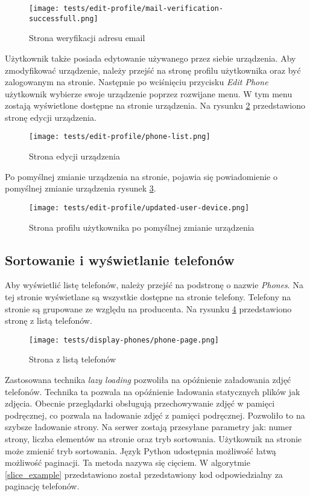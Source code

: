 \begin{figure}[H]
  \centering
  \texttt{[image: tests/edit-profile/mail-verification-successfull.png]}
  \caption{Strona weryfikacji adresu email}
  \label{verify_email_page}
\end{figure}
Użytkownik także posiada edytowanie używanego przez siebie urządzenia. Aby zmodyfikować urządzenie, należy przejść na stronę profilu użytkownika oraz być zalogowanym na stronie. Następnie po wciśnięciu przycisku \textit{Edit Phone} użytkownik wybierze swoje urządzenie poprzez rozwijane menu. W tym menu zostają wyświetlone dostępne na stronie urządzenia. Na rysunku \ref{edit_phone} przedstawiono stronę edycji urządzenia.
\begin{figure}[H]
  \centering
  \texttt{[image: tests/edit-profile/phone-list.png]}
  \caption{Strona edycji urządzenia}
  \label{edit_phone}
\end{figure}
Po pomyślnej zmianie urządzenia na stronie, pojawia się powiadomienie o pomyślnej zmianie urządzenia rysunek \ref{edit_phone_success}.
\begin{figure}[H]
  \centering
  \texttt{[image: tests/edit-profile/updated-user-device.png]}
  \caption{Strona profilu użytkownika po pomyślnej zmianie urządzenia}
  \label{edit_phone_success}
\end{figure}

\subsection{Sortowanie i wyświetlanie telefonów}
Aby wyświetlić listę telefonów, należy przejść na podstronę o nazwie \textit{Phones}. Na tej stronie wyświetlane są wszystkie dostępne na stronie telefony. Telefony na stronie są grupowane ze względu na producenta. Na rysunku \ref{phones_page} przedstawiono stronę z listą telefonów.
\begin{figure}[H]
  \centering
  \texttt{[image: tests/display-phones/phone-page.png]}
  \caption{Strona z listą telefonów}
  \label{phones_page}
\end{figure}
Zastosowana technika \textit{lazy loading} pozwoliła na opóźnienie załadowania zdjęć telefonów. Technika ta pozwala na opóźnienie ładowania statycznych plików jak zdjęcia. Obecnie przeglądarki obsługują przechowywanie zdjęć w pamięci podręcznej, co pozwala na ładowanie zdjęć z pamięci podręcznej. Pozwoliło to na szybsze ładowanie strony. Na serwer zostają przesyłane parametry jak: numer strony, liczba elementów na stronie oraz tryb sortowania. Użytkownik na stronie może zmienić tryb sortowania. Język Python udostępnia możliwość łatwą możliwość paginacji. Ta metoda nazywa się cięciem. W algorytmie \ref{slice_example} przedstawiono został przedstawiony kod odpowiedzialny za paginację telefonów.

